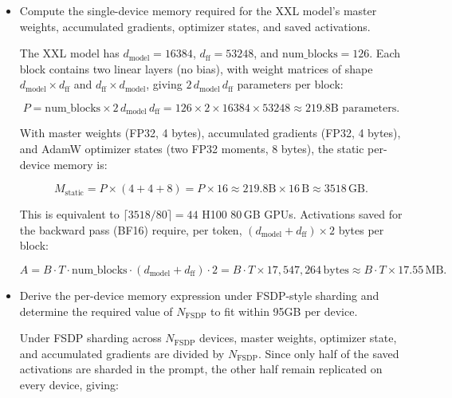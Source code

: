 \documentclass[letterpaper]{article}
\begin{document}
	\begin{itemize}
		\item[(a)] Compute the single-device memory required for the XXL model's master weights, accumulated gradients, optimizer states, and saved activations.
		
		The XXL model has $d_{\text{model}}=16384$, $d_{\text{ff}}=53248$, and $\text{num\_blocks}=126$.
		Each block contains two linear layers (no bias), with weight matrices of shape $d_{\text{model}}\times d_{\text{ff}}$ and $d_{\text{ff}}\times d_{\text{model}}$, giving $2\,d_{\text{model}}\,d_{\text{ff}}$ parameters per block:
		
		\begin{equation}
			P = \text{num\_blocks}\times 2\,d_{\text{model}}\,d_{\text{ff}}
			= 126 \times 2 \times 16384 \times 53248
			\approx 219.8\text{B parameters.}
		\end{equation}
		
		With master weights (FP32, 4 bytes), accumulated gradients (FP32, 4 bytes), and AdamW optimizer states (two FP32 moments, 8 bytes), the static per-device memory is:
		
		\begin{equation}
			M_{\text{static}} = P \times (4 + 4 + 8) = P \times 16
			\approx 219.8\text{B} \times 16\,\text{B} \approx 3518\,\text{GB}.
		\end{equation}
		
		This is equivalent to $\lceil 3518/80 \rceil = 44$ H100 80\,GB GPUs.\linebreak
		Activations saved for the backward pass (BF16) require, per token, $(d_{\text{model}}+d_{\text{ff}})\times 2$ bytes per block:
		
		\begin{equation}
			A = B\cdot T\cdot\text{num\_blocks}\cdot(d_{\text{model}}+d_{\text{ff}})\cdot 2
			= B\cdot T \times 17{,}547{,}264\,\text{bytes}
			\approx B\cdot T \times 17.55\,\text{MB}.
		\end{equation}
		
		\item[(b)] Derive the per-device memory expression under FSDP-style sharding and determine the required value of $N_{\mathrm{FSDP}}$ to fit within 95GB per device.
		
		Under FSDP sharding across $N_{\text{FSDP}}$ devices, master weights, optimizer state, and accumulated gradients are divided by $N_{\text{FSDP}}$. Since only half of the saved activations are sharded in the prompt, the other half remain replicated on every device, giving:
		

\end{itemize}
\end{document}
